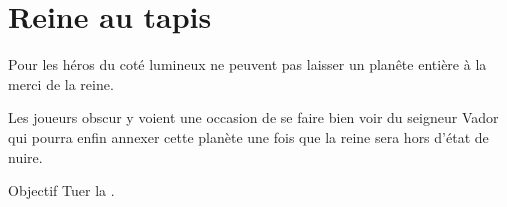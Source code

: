 \section{Reine au tapis}

\lettrine{\jedifont{\$}} Pour les héros du coté lumineux ne peuvent pas laisser un planête entière à la merci de la reine. 

\lettrine{\jedifont{\#}} Les joueurs obscur y voient une occasion de se faire bien voir du seigneur Vador qui pourra enfin annexer cette planète une fois que la reine sera hors d’état de nuire.

\begin{paperbox}{Objectif}
Tuer la .
\end{paperbox}